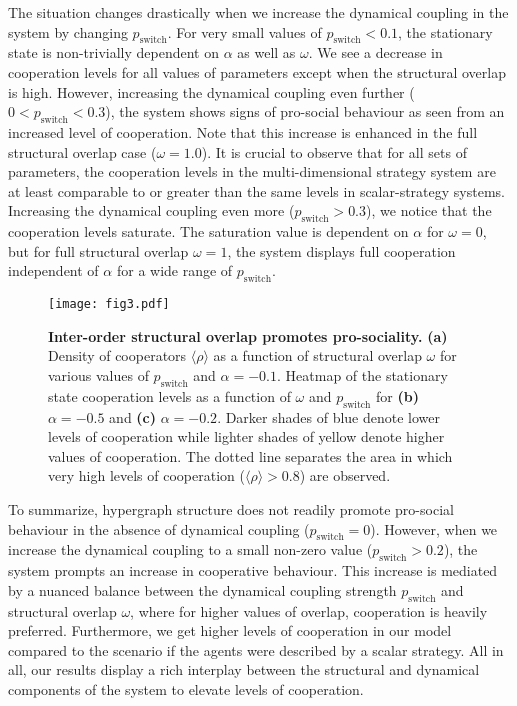 \documentclass[a4paper,pre,reqno,superscriptaddress,twocolumn, floatfix]{revtex4}
\begin{document}
The situation changes drastically when we increase the dynamical coupling in the system by changing $p_{\text{switch}}$. For very small values of $p_{\text{switch}} < 0.1$, the stationary state is non-trivially dependent on $\alpha$ as well as $\omega$. We see a decrease in cooperation levels for all values of parameters except when the structural overlap is high. However, increasing the dynamical coupling even further ($0 < p_{\text{switch}} < 0.3$), the system shows signs of pro-social behaviour as seen from an increased level of cooperation. Note that this increase is enhanced in the full structural overlap case ($\omega=1.0$). It is crucial to observe that for all sets of parameters, the cooperation levels in the multi-dimensional strategy system are at least comparable to or greater than the same levels in scalar-strategy systems. Increasing the dynamical coupling even more ($p_{\text{switch}}>0.3$), we notice that the cooperation levels saturate. The saturation value is dependent on $\alpha$ for $\omega=0$, but for full structural overlap $\omega=1$, the system displays full cooperation independent of $\alpha$ for a wide range of $p_{\text{switch}}$.





\begin{figure*}[!ht]
    \centering
    \texttt{[image: fig3.pdf]}
    \caption{\textbf{Inter-order structural overlap promotes pro-sociality.} \textbf{(a)} Density of cooperators $\langle \rho \rangle$ as a function of structural overlap $\omega$ for various values of $p_{\text{switch}}$ and $\alpha=-0.1$. Heatmap of the stationary state cooperation levels as a function of $\omega$ and $p_{\text{switch}}$ for \textbf{(b)} $\alpha=-0.5$ and \textbf{(c)} $\alpha=-0.2$. Darker shades of blue denote lower levels of cooperation while lighter shades of yellow denote higher values of cooperation. The dotted line separates the area in which very high levels of cooperation ($\langle \rho \rangle > 0.8$) are observed.}
    \label{fig:overlap}
\end{figure*}


To summarize, hypergraph structure does not readily promote pro-social behaviour in the absence of dynamical coupling ($p_{\text{switch}} = 0$). However, when we increase the dynamical coupling to a small non-zero value ($p_{\text{switch}} > 0.2$), the system prompts an increase in cooperative behaviour. This increase is mediated by a nuanced balance between the dynamical coupling strength $p_{\text{switch}}$ and structural overlap $\omega$, where for higher values of overlap, cooperation is heavily preferred. Furthermore, we get higher levels of cooperation in our model compared to the scenario if the agents were described by a scalar strategy.  All in all, our results display a rich interplay between the structural and dynamical components of the system to elevate levels of cooperation.
\end{document}
